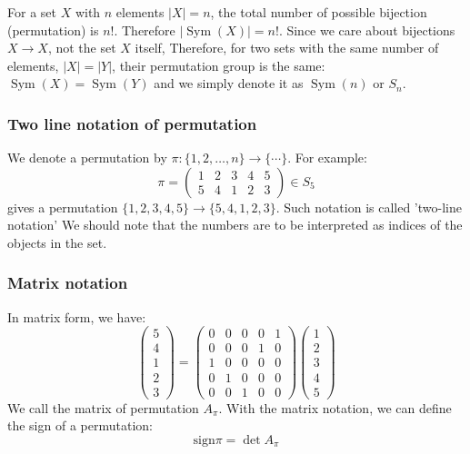 \documentclass{amsart}
\theoremstyle{remark}
\theoremstyle{remark}
\theoremstyle{definition}
\DeclareMathOperator{\Sym}{Sym}
\begin{document}
\vspace{10pt}

For a set $X$ with $n$ elements $|X| = n$, the total number of possible bijection (permutation) is $n!$. Therefore $|\Sym(X)| = n!$.
Since we care about bijections $X\to X$, not the set $X$ itself, Therefore, for two sets with the same number of elements,
$|X| = |Y|$, their permutation group is the same: $\Sym(X) = \Sym(Y)$ and we simply denote it as $\Sym(n)$ or $S_n$.

\subsubsection*{Two line notation of permutation}
We denote a permutation by $\pi\colon \{1,2,\dots,n\} \to \{ \cdots \}$. For example:
\[
    \pi = \left(  
    \begin{matrix} 
    1&2&3&4&5\\
    5&4&1&2&3
    \end{matrix}
    \right) \in S_5
\]
gives a permutation $\{1,2,3,4,5\} \to \{ 5,4,1,2,3 \}$. Such notation is called 'two-line notation'
We should note that the numbers are to be interpreted as indices of the objects in the set.

\subsubsection*{Matrix notation}
In matrix form, we have:
\begin{equation*}
    \left( \begin{matrix} 5 \\ 4 \\ 1 \\ 2\\ 3 \end{matrix} \right)
    = \left( \begin{matrix} 
        0 & 0 & 0 & 0 & 1 \\
        0 & 0 & 0 & 1 & 0 \\
        1 & 0 & 0 & 0 & 0 \\
        0 & 1 & 0 & 0 & 0 \\
        0 & 0 & 1 & 0 & 0 
    \end{matrix} \right) 
    \left( \begin{matrix} 1 \\ 2 \\ 3 \\ 4 \\ 5 \end{matrix} \right)
\end{equation*}
We call the matrix of permutation $A_{\pi}$. 
With the matrix notation, we can define the sign of a permutation:
\[\text{sign}\pi = \det A_{\pi}\]
\end{document}
